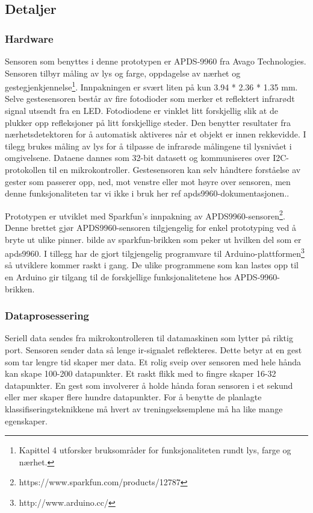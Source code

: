 \subsection{Detaljer}
\subsubsection{Hardware}
Sensoren som benyttes i denne prototypen er APDS-9960 fra Avago Technologies. Sensoren tilbyr måling av lys og farge, oppdagelse av nærhet og gestegjenkjennelse\footnote{Kapittel 4 utforsker bruksområder for funksjonaliteten rundt lys, farge og nærhet.}. Innpakningen er svært liten på kun 3.94 * 2.36 * 1.35 mm. Selve gestesensoren består av fire fotodioder som merker et reflektert infrarødt signal utsendt fra en LED. Fotodiodene er vinklet litt forskjellig slik at de plukker opp refleksjoner på litt forskjellige steder. Den benytter resultater fra nærhetsdetektoren for å automatisk aktiveres når et objekt er innen rekkevidde. I tilegg brukes måling av lys for å tilpasse de infrarøde målingene til lysnivået i omgivelsene. Dataene dannes som 32-bit datasett og kommuniseres over I2C-protokollen til en mikrokontroller. Gestesensoren kan selv håndtere forståelse av gester som passerer opp, ned, mot venstre eller mot høyre over sensoren, men denne funksjonaliteten tar vi ikke i bruk her {\color{red} ref apds9960-dokumentasjonen.}.

Prototypen er utviklet med Sparkfun's innpakning av APDS9960-sensoren\footnote{https://www.sparkfun.com/products/12787}. Denne brettet gjør APDS9960-sensoren tilgjengelig for enkel prototyping ved å bryte ut ulike pinner. {\color{red} bilde av sparkfun-brikken som peker ut hvilken del som er apds9960.} I tillegg har de gjort tilgjengelig programvare til Arduino-plattformen\footnote{http://www.arduino.cc/} så utviklere kommer raskt i gang. De ulike programmene som kan lastes opp til en Arduino gir tilgang til de forskjellige funksjonalitetene hos APDS-9960-brikken.

\subsubsection{Dataprosessering}
Seriell data sendes fra mikrokontrolleren til datamaskinen som lytter på riktig port. Sensoren sender data så lenge ir-signalet reflekteres. Dette betyr at en gest som tar lengre tid skaper mer data. Et rolig sveip over sensoren med hele hånda kan skape 100-200 datapunkter. Et raskt flikk med to fingre skaper 16-32 datapunkter. En gest som involverer å holde hånda foran sensoren i et sekund eller mer skaper flere hundre datapunkter. For å benytte de planlagte klassifiseringsteknikkene må hvert av treningseksemplene må ha like mange egenskaper.

